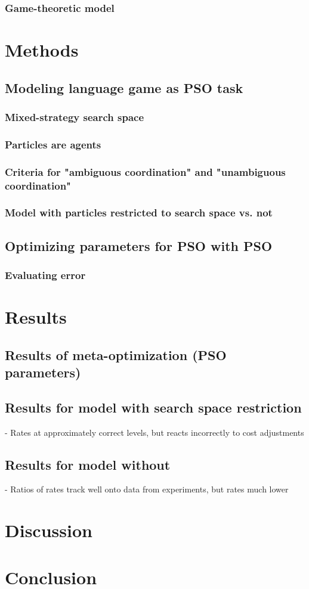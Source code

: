 \documentclass[12pt]{article}
\begin{document}
\subsubsection{Game-theoretic model}


\section{Methods}
\subsection{Modeling language game as PSO task}
\subsubsection{Mixed-strategy search space}
\subsubsection{Particles are agents}
\subsubsection{Criteria for "ambiguous coordination" and "unambiguous coordination"}
\subsubsection{Model with particles restricted to search space vs. not}

\subsection{Optimizing parameters for PSO with PSO}
\subsubsection{Evaluating error}

\section{Results}
\subsection{Results of meta-optimization (PSO parameters)}
\subsection{Results for model with search space restriction}
- Rates at approximately correct levels, but reacts incorrectly to cost adjustments
\subsection{Results for model without}
- Ratios of rates track well onto data from experiments, but rates much lower


\section{Discussion}



\section{Conclusion}





\end{document}
